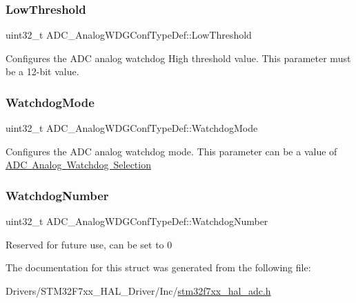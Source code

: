 \subsubsection{\texorpdfstring{LowThreshold}{LowThreshold}}
{\footnotesize\ttfamily uint32\+\_\+t A\+D\+C\+\_\+\+Analog\+W\+D\+G\+Conf\+Type\+Def\+::\+Low\+Threshold}

Configures the A\+DC analog watchdog High threshold value. This parameter must be a 12-\/bit value. \mbox{\label{struct_a_d_c___analog_w_d_g_conf_type_def_ad4c60783321a30e8edffa323148e424d}} 
\subsubsection{\texorpdfstring{WatchdogMode}{WatchdogMode}}
{\footnotesize\ttfamily uint32\+\_\+t A\+D\+C\+\_\+\+Analog\+W\+D\+G\+Conf\+Type\+Def\+::\+Watchdog\+Mode}

Configures the A\+DC analog watchdog mode. This parameter can be a value of \mbox{\hyperlink{group___a_d_c__analog__watchdog__selection}{A\+DC Analog Watchdog Selection}} \mbox{\label{struct_a_d_c___analog_w_d_g_conf_type_def_a025e81af21b93c5b8daf9f5241383302}} 
\subsubsection{\texorpdfstring{WatchdogNumber}{WatchdogNumber}}
{\footnotesize\ttfamily uint32\+\_\+t A\+D\+C\+\_\+\+Analog\+W\+D\+G\+Conf\+Type\+Def\+::\+Watchdog\+Number}

Reserved for future use, can be set to 0 

The documentation for this struct was generated from the following file\+:\begin{DoxyCompactItemize}
\item 
Drivers/\+S\+T\+M32\+F7xx\+\_\+\+H\+A\+L\+\_\+\+Driver/\+Inc/\mbox{\hyperlink{stm32f7xx__hal__adc_8h}{stm32f7xx\+\_\+hal\+\_\+adc.\+h}}\end{DoxyCompactItemize}
